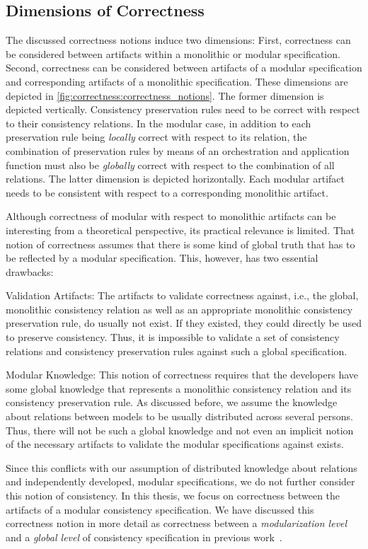 \subsection{Dimensions of Correctness}
\label{chap:correctness:notions_correctness:dimensions}

The discussed correctness notions induce two dimensions: First, correctness can be considered between artifacts within a monolithic or modular specification. Second, correctness can be considered between artifacts of a modular specification and corresponding artifacts of a monolithic specification. These dimensions are depicted in \autoref{fig:correctness:correctness_notions}.
The former dimension is depicted vertically. Consistency preservation rules need to be correct with respect to their consistency relations.
In the modular case, in addition to each preservation rule being \emph{locally} correct with respect to its relation, the combination of preservation rules by means of an orchestration and application function must also be \emph{globally} correct with respect to the combination of all relations.
The latter dimension is depicted horizontally. Each modular artifact needs to be consistent with respect to a corresponding monolithic artifact.

Although correctness of modular with respect to monolithic artifacts can be interesting from a theoretical perspective, its practical relevance is limited.
That notion of correctness assumes that there is some kind of global truth that has to be reflected by a modular specification.
This, however, has two essential drawbacks:
\begin{properdescription}
    \item[Validation Artifacts:] The artifacts to validate correctness against, i.e., the global, monolithic consistency relation as well as an appropriate monolithic consistency preservation rule, do usually not exist. If they existed, they could directly be used to preserve consistency. Thus, it is impossible to validate a set of consistency relations and consistency preservation rules against such a global specification.
    \item[Modular Knowledge:] This notion of correctness requires that the developers have some global knowledge that represents a monolithic consistency relation and its consistency preservation rule. As discussed before, we assume  the knowledge about relations between models to be usually distributed across several persons. Thus, there will not be such a global knowledge and not even an implicit notion of the necessary artifacts to validate the modular specifications against exists.
\end{properdescription}
%
Since this conflicts with our assumption of distributed knowledge about relations and independently developed, modular specifications, we do not further consider this notion of consistency.
In this thesis, we focus on correctness between the artifacts of a modular consistency specification.
We have discussed this correctness notion in more detail as correctness between a \emph{modularization level} and a \emph{global level} of consistency specification in previous work~.


